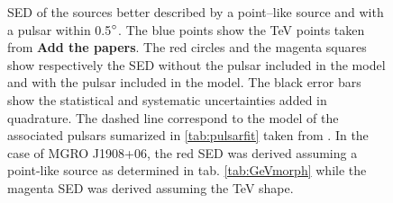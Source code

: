 \begin{figure}[h!]
{\label{fig:mgroj2228}
}
\caption{\label{fig:sedsourcespuls}SED of the sources better described by a point--like source and with a pulsar within 0.5$\mbox{$^\circ$}$. The blue points show the TeV points taken from \textbf{Add the papers}. The red circles and the magenta squares show respectively the SED without the pulsar included in the model and with the pulsar included in the model. The black error bars show the statistical and   systematic uncertainties added in quadrature. The dashed line correspond to the model of the associated pulsars sumarized in \ref{tab:pulsarfit} taken from \cite{2012ApJS..199...31N}. In the case of MGRO J1908+06, the red SED was derived assuming a point-like source as determined in tab. \ref{tab:GeVmorph} while the magenta SED was derived assuming the TeV shape.}
\end{figure}

